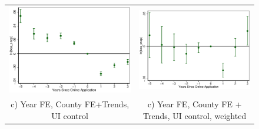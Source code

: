 \documentclass[11pt,letterpaper]{article}
\begin{document}
\begin{figure}
\begin{tabular}{cc}
\includegraphics[scale=0.57]{tabfig/evstu_bea_snap_one_yrcfcttru_5_3}&\includegraphics[scale=0.57]{tabfig/evstu_bea_snap_total_pop_yrcfcttru_5_3}\\
c) Year FE, County FE+Trends, UI control& c) Year FE, County FE + Trends, UI control, weighted\\


\end{tabular}
\end{figure}
\end{document}
